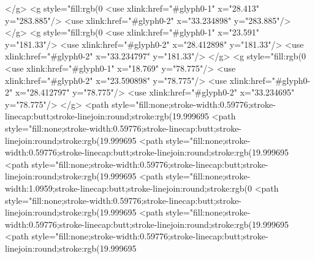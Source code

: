 </g>
<g style="fill:rgb(0%
  <use xlink:href="#glyph0-1" x="28.413" y="283.885"/>
  <use xlink:href="#glyph0-2" x="33.234898" y="283.885"/>
</g>
<g style="fill:rgb(0%
  <use xlink:href="#glyph0-1" x="23.591" y="181.33"/>
  <use xlink:href="#glyph0-2" x="28.412898" y="181.33"/>
  <use xlink:href="#glyph0-2" x="33.234797" y="181.33"/>
</g>
<g style="fill:rgb(0%
  <use xlink:href="#glyph0-1" x="18.769" y="78.775"/>
  <use xlink:href="#glyph0-2" x="23.590898" y="78.775"/>
  <use xlink:href="#glyph0-2" x="28.412797" y="78.775"/>
  <use xlink:href="#glyph0-2" x="33.234695" y="78.775"/>
</g>
<path style="fill:none;stroke-width:0.59776;stroke-linecap:butt;stroke-linejoin:round;stroke:rgb(19.999695%
<path style="fill:none;stroke-width:0.59776;stroke-linecap:butt;stroke-linejoin:round;stroke:rgb(19.999695%
<path style="fill:none;stroke-width:0.59776;stroke-linecap:butt;stroke-linejoin:round;stroke:rgb(19.999695%
<path style="fill:none;stroke-width:0.59776;stroke-linecap:butt;stroke-linejoin:round;stroke:rgb(19.999695%
<path style="fill:none;stroke-width:1.0959;stroke-linecap:butt;stroke-linejoin:round;stroke:rgb(0%
<path style="fill:none;stroke-width:0.59776;stroke-linecap:butt;stroke-linejoin:round;stroke:rgb(19.999695%
<path style="fill:none;stroke-width:0.59776;stroke-linecap:butt;stroke-linejoin:round;stroke:rgb(19.999695%
<path style="fill:none;stroke-width:0.59776;stroke-linecap:butt;stroke-linejoin:round;stroke:rgb(19.999695%
